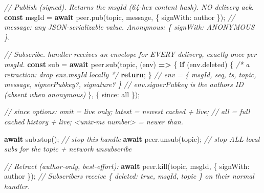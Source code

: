 \documentclass[
  nobib]{tufte-handout}
\newenvironment{Shaded}{}{}
\newcommand{\AttributeTok}[1]{\textcolor[rgb]{0.49,0.56,0.16}{#1}}
\newcommand{\CommentTok}[1]{\textcolor[rgb]{0.38,0.63,0.69}{\textit{#1}}}
\newcommand{\ControlFlowTok}[1]{\textcolor[rgb]{0.00,0.44,0.13}{\textbf{#1}}}
\newcommand{\DataTypeTok}[1]{\textcolor[rgb]{0.56,0.13,0.00}{#1}}
\newcommand{\FunctionTok}[1]{\textcolor[rgb]{0.02,0.16,0.49}{#1}}
\newcommand{\KeywordTok}[1]{\textcolor[rgb]{0.00,0.44,0.13}{\textbf{#1}}}
\newcommand{\NormalTok}[1]{#1}
\newcommand{\OperatorTok}[1]{\textcolor[rgb]{0.40,0.40,0.40}{#1}}
\newcommand{\StringTok}[1]{\textcolor[rgb]{0.25,0.44,0.63}{#1}}
\begin{document}
\begin{Shaded}
\begin{Highlighting}[]
\CommentTok{// Publish (signed). Returns the msgId (64{-}hex content hash). NO delivery ack.}
\KeywordTok{const}\NormalTok{ msgId }\OperatorTok{=} \ControlFlowTok{await}\NormalTok{ peer}\OperatorTok{.}\FunctionTok{pub}\NormalTok{(topic}\OperatorTok{,}\NormalTok{ message}\OperatorTok{,}\NormalTok{ \{ }\DataTypeTok{signWith}\OperatorTok{:}\NormalTok{ author \})}\OperatorTok{;}
\CommentTok{// message: any JSON{-}serializable value. Anonymous: \{ signWith: ANONYMOUS \}.}

\CommentTok{// Subscribe. handler receives an envelope for EVERY delivery, exactly once per msgId.}
\KeywordTok{const}\NormalTok{ sub }\OperatorTok{=} \ControlFlowTok{await}\NormalTok{ peer}\OperatorTok{.}\FunctionTok{sub}\NormalTok{(topic}\OperatorTok{,}\NormalTok{ (env) }\KeywordTok{=\textgreater{}}\NormalTok{ \{}
  \ControlFlowTok{if}\NormalTok{ (env}\OperatorTok{.}\AttributeTok{deleted}\NormalTok{) \{ }\CommentTok{/* a retraction: drop env.msgId locally */} \ControlFlowTok{return}\OperatorTok{;}\NormalTok{ \}}
  \CommentTok{// env = \{ msgId, seq, ts, topic, message, signerPubkey?, signature? \}}
  \CommentTok{// env.signerPubkey is the author\textquotesingle{}s ID (absent when anonymous)}
\NormalTok{\}}\OperatorTok{,}\NormalTok{ \{ }\DataTypeTok{since}\OperatorTok{:} \StringTok{\textquotesingle{}all\textquotesingle{}}\NormalTok{ \})}\OperatorTok{;}

\CommentTok{// since options: omit = live only; \textquotesingle{}latest\textquotesingle{} = newest cached + live;}
\CommentTok{//                \textquotesingle{}all\textquotesingle{} = full cached history + live; \textless{}unix{-}ms number\textgreater{} = newer than.}

\ControlFlowTok{await}\NormalTok{ sub}\OperatorTok{.}\FunctionTok{stop}\NormalTok{()}\OperatorTok{;}          \CommentTok{// stop this handle}
\ControlFlowTok{await}\NormalTok{ peer}\OperatorTok{.}\FunctionTok{unsub}\NormalTok{(topic)}\OperatorTok{;}   \CommentTok{// stop ALL local subs for the topic + network unsubscribe}

\CommentTok{// Retract (author{-}only, best{-}effort):}
\ControlFlowTok{await}\NormalTok{ peer}\OperatorTok{.}\FunctionTok{kill}\NormalTok{(topic}\OperatorTok{,}\NormalTok{ msgId}\OperatorTok{,}\NormalTok{ \{ }\DataTypeTok{signWith}\OperatorTok{:}\NormalTok{ author \})}\OperatorTok{;}
\CommentTok{// Subscribers receive \{ deleted: true, msgId, topic \} on their normal handler.}
\end{Highlighting}
\end{Shaded}
\end{document}

